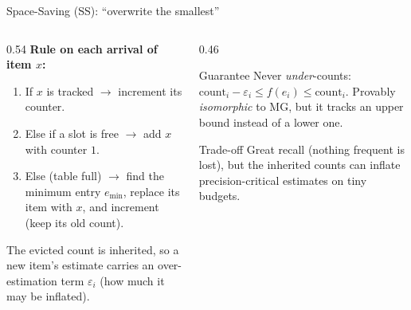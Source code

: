 \documentclass[11pt,aspectratio=169]{beamer}
\begin{document}
\begin{frame}{Space-Saving (SS): ``overwrite the smallest''}
  \begin{columns}[T]
    \begin{column}{0.54\textwidth}
      \textbf{Rule on each arrival of item $x$:}
      \begin{enumerate}
        \item If $x$ is tracked $\to$ increment its counter.
        \item Else if a slot is free $\to$ add $x$ with counter $1$.
        \item Else (table full) $\to$ find the \alert{minimum} entry $e_{\min}$,
              \alert{replace its item with $x$}, and increment (keep its old count).
      \end{enumerate}
      \vspace{0.4em}
      The evicted count is inherited, so a new item's estimate carries an
      over-estimation term $\varepsilon_i$ (how much it may be inflated).
    \end{column}
    \begin{column}{0.46\textwidth}
      \begin{block}{Guarantee}
        Never \emph{under}-counts: $\text{count}_i-\varepsilon_i \le f(e_i) \le \text{count}_i$.
        Provably \emph{isomorphic} to MG, but it tracks an upper bound instead of a lower one.
      \end{block}
      \begin{exampleblock}{Trade-off}
        Great recall (nothing frequent is lost), but the inherited counts can
        inflate precision-critical estimates on tiny budgets.
      \end{exampleblock}
    \end{column}
  \end{columns}
\end{frame}
\end{document}
